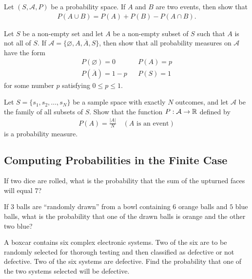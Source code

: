 	\begin{problem}
	Let $(S, \mathcal{A}, P )$ be a probability space. If $A$ and $B$ are two events, then show that
	\begin{align*}
	P (A \cup B) = P (A) + P (B) - P (A \cap B) .
	\end{align*}
	\end{problem}
	
	\begin{problem}
	Let $S$ be a non-empty set and let $A$ be a non-empty subset of $S$ such that $A$ is not all of $S$. If $\mathcal{A} = \{ \varnothing , A , \overline{A} , S \}$, then show that all probability measures on $\mathcal{A}$ have the form
	\begin{align*}
	P (\varnothing ) = 0 & & P (A ) = p \\
	P (\overline{A}) = 1 - p && P (S) = 1 
	\end{align*}
	for some number $p$ satisfying $0 \leq p \leq 1$.
	\end{problem}
	
	\begin{problem}
	Let $S = \{ s_1 , s_2 , \ldots , s_N \}$ be a sample space with exactly $N$ outcomes, and let $\mathcal{A}$ be the family of all subsets of $S$. Show that the function $P : \mathcal{A} \rightarrow \mathbb{R}$ defined by
	\begin{align*}
	P (A) = \frac{|A|}{N} \quad (A \text{ is an event})
	\end{align*}
	is a probability measure.
	\end{problem}
	
	\subsection{Computing Probabilities in the Finite Case}
	
	\begin{problem}
	If two dice are rolled, what is the probability that the sum of the upturned faces will equal $7$?
	\end{problem}
	
	\begin{problem}
	If $3$ balls are ``randomly drawn'' from a bowl containing $6$ orange balls and $5$ blue balls, what is the probability that one of the drawn balls is orange and the other two blue?
	\end{problem}

	\begin{problem} %
	A boxcar contains six complex electronic systems. Two of the six are to be randomly selected for thorough testing and then classified as defective or not defective. Two of the six systems are defective. Find the probability that one of the two systems selected will be defective.
	\end{problem}
	
